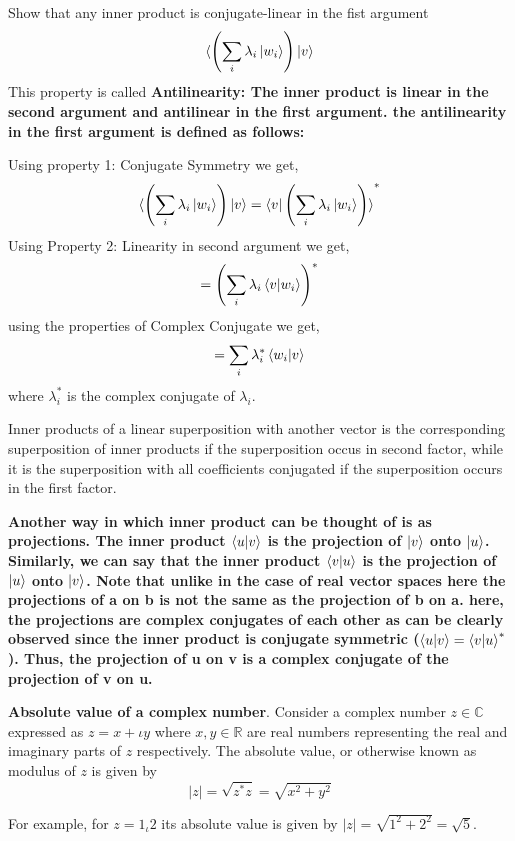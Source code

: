 \begin{example}
    Show that any inner product is conjugate-linear in the fist argument
    \[
    \braket{\left(\sum_i \lambda_i \ket{w_i}\right)|v}
    \]  
    This property is called \textbf{Antilinearity: The inner product is linear in the second argument and antilinear in the first argument. the antilinearity in the first argument is defined as follows:}

    Using property 1: Conjugate Symmetry we get,
    \[
    \braket{\left(\sum_i \lambda_i \ket{w_i}\right)|v}=
    \braket{v|\left(\sum_i \lambda_i \ket{w_i}\right)}^*
    \]
    Using Property 2: Linearity in second argument we get,
    \[
    = \left(\sum_i \lambda_i \braket{v|w_i} \right)^*
    \]
    using the properties of Complex Conjugate we get,
    \[
    = \sum_i \lambda_i^* \braket{w_i|v}
    \]
    where $\lambda_i^*$ is the complex conjugate of $\lambda_i$.
\end{example}   
Inner products of a linear superposition with another vector is the corresponding superposition of inner products if the superposition
occus in second factor, while it is the superposition with all coefficients conjugated if the superposition occurs in the first factor.

\textbf{Another way in which inner product can be thought of is as projections. The inner product $\braket{u|v}$ is the projection 
of $\ket{v}$ onto $\ket{u}$. Similarly, we can say that the inner product $\braket{v|u}$ is the projection of $\ket{u}$ onto $\ket{v}$. Note that unlike in 
the case of real vector spaces here the projections of a on b is not the same as the projection of b on a. here, the projections are complex conjugates of each other as 
can be clearly observed since the inner product is conjugate symmetric ($\braket{u|v}=\braket{v|u}^*$). Thus, the projection of u on v is a complex conjugate of 
the projection of v on u.}
\begin{definition}
    \textbf{Absolute value of a complex number}. Consider a complex number $z\in\mathbb{C}$ expressed as $z=x+\iota y$ where $x,y \in \mathbb{R}$ are real numbers representing the real and imaginary parts of $z$ respectively. The absolute value, or otherwise known as modulus of $z$ is given by
    \[
    |z|=\sqrt{z^*z}=\sqrt{x^2+y^2}
    \]
\end{definition}
\begin{example}
    For example, for $z=1_\iota 2$ its absolute value is given by $|z|=\sqrt{1^2+2^2}=\sqrt{5}$.
\end{example}

